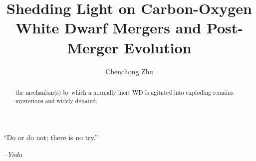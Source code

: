 \documentclass{ut-thesis}
\author{Chenchong Zhu}
\title{Shedding Light on Carbon-Oxygen White Dwarf Mergers and Post-Merger Evolution}
\begin{document}
\begin{preliminary}

\maketitle


\begin{abstract}

 the mechanism(s) by which a normally inert WD is agitated into exploding remains mysterious and widely debated.
\end{abstract}



\vspace*{\fill}
\begin{center}
\begin{minipage}[c]{4.75in}
  ``Do or do not; there is no try.''\vspace{2em}

\hfill \emph{--Yoda}

\end{minipage}
\end{center}
\vspace*{\fill}



\end{preliminary}
\end{document}

